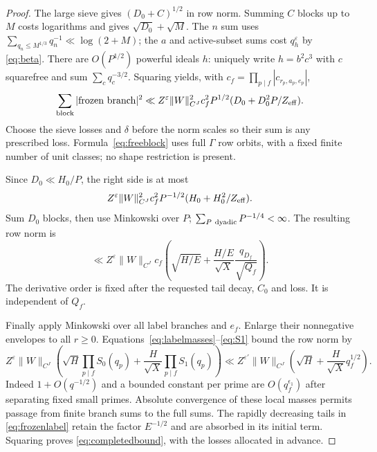 \documentclass[11pt,a4paper]{article}
\numberwithin{equation}{section}
\theoremstyle{definition}
\theoremstyle{remark}
\newcommand{\eps}{\varepsilon}
\begin{document}
\begin{proof}
The large sieve gives $(D_0+C)^{1/2}$ in row norm. Summing $C$ blocks up to $M$ costs logarithms and gives $\sqrt{D_0}+\sqrt M$. The $n$ sum uses $\sum_{q_n\le M^{1/3}}q_n^{-1}\ll\log(2+M)$; the $a$ and active-subset sums cost $q_h^\eps$ by \eqref{eq:beta}. There are $O(P^{1/2})$ powerful ideals $h$: uniquely write $h=b^2c^3$ with $c$ squarefree and sum $\sum_cq_c^{-3/2}$. Squaring yields, with $c_f=\prod_{p\mid f}|c_{r_p,a_p,e_p}|$,
\begin{equation}\label{eq:freeblock}
 \sum_{\text{block}}|\text{frozen branch}|^2
 \ll Z^\eps\|W\|_{C^J}^2c_f^2P^{1/2}
                 (D_0+D_0^2P/Z_{\rm eff}).
\end{equation}
Choose the sieve losses and $\delta$ before the norm scales so their sum is any prescribed loss. Formula~\eqref{eq:freeblock} uses full $\Gamma$ row orbits, with a fixed finite number of unit classes; no shape restriction is present.

Since $D_0\ll H_0/P$, the right side is at most
\[
 Z^\eps\|W\|_{C^J}^2c_f^2P^{-1/2}
                          (H_0+H_0^2/Z_{\rm eff}).
\]
Sum $D_0$ blocks, then use Minkowski over $P$; $\sum_{P\ {\rm dyadic}}P^{-1/4}<\infty$. The resulting row norm is
\begin{equation}\label{eq:frozenlabel}
 \ll Z^\eps\|W\|_{C^J}c_f
      \left(\sqrt{H/E}+\frac{H/E}{\sqrt X}
                                      \frac{q_{D_f}}{\sqrt{Q_f}}\right).
\end{equation}
The derivative order is fixed after the requested tail decay, $C_0$ and loss. It is independent of $Q_f$.

Finally apply Minkowski over all label branches and $e_f$. Enlarge their nonnegative envelopes to all $r\ge0$. Equations~\eqref{eq:labelmasses}--\eqref{eq:S1} bound the row norm by
\[
 Z^\eps\|W\|_{C^J}
 \left(\sqrt H\prod_{p\mid f}S_0(q_p)
      +\frac H{\sqrt X}\prod_{p\mid f}S_1(q_p)\right)
 \ll Z^{\eps'}\|W\|_{C^J}
           \left(\sqrt H+\frac H{\sqrt X}q_f^{1/2}\right).
\]
Indeed $1+O(q^{-1/2})$ and a bounded constant per prime are $O(q_f^{\epsilon_1})$ after separating fixed small primes. Absolute convergence of these local masses permits passage from finite branch sums to the full sums. The rapidly decreasing tails in \eqref{eq:frozenlabel} retain the factor $E^{-1/2}$ and are absorbed in its initial term. Squaring proves \eqref{eq:completedbound}, with the losses allocated in advance.
\end{proof}
\end{document}
